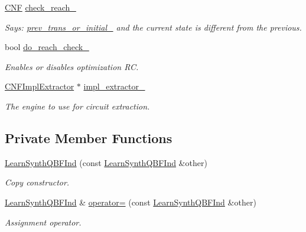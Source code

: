 \begin{DoxyCompactItemize}
\hyperlink{classCNF}{C\-N\-F} \hyperlink{classLearnSynthQBFInd_a6854254065f912e3d5fe07a1b895f1c6}{check\-\_\-reach\-\_\-}
\begin{DoxyCompactList}\small\item\em Says\-: \hyperlink{classLearnSynthQBFInd_ad99eafb7ee9134115f9fbe986e5eb0c5}{prev\-\_\-trans\-\_\-or\-\_\-initial\-\_\-} and the current state is different from the previous. \end{DoxyCompactList}\item 
bool \hyperlink{classLearnSynthQBFInd_af87e4a2c1d17c4c5bc398082d6d3e365}{do\-\_\-reach\-\_\-check\-\_\-}
\begin{DoxyCompactList}\small\item\em Enables or disables optimization R\-C. \end{DoxyCompactList}\item 
\hyperlink{classCNFImplExtractor}{C\-N\-F\-Impl\-Extractor} $\ast$ \hyperlink{classLearnSynthQBFInd_a8c285416b6f27e86bdda92fd578327b8}{impl\-\_\-extractor\-\_\-}
\begin{DoxyCompactList}\small\item\em The engine to use for circuit extraction. \end{DoxyCompactList}\end{DoxyCompactItemize}
\subsection*{Private Member Functions}
\begin{DoxyCompactItemize}
\item 
\hyperlink{classLearnSynthQBFInd_a55edd29ba2b93167b7d7b2bf6b835673}{Learn\-Synth\-Q\-B\-F\-Ind} (const \hyperlink{classLearnSynthQBFInd}{Learn\-Synth\-Q\-B\-F\-Ind} \&other)
\begin{DoxyCompactList}\small\item\em Copy constructor. \end{DoxyCompactList}\item 
\hyperlink{classLearnSynthQBFInd}{Learn\-Synth\-Q\-B\-F\-Ind} \& \hyperlink{classLearnSynthQBFInd_a411e8fa65ea22877c0fa9180f31120f9}{operator=} (const \hyperlink{classLearnSynthQBFInd}{Learn\-Synth\-Q\-B\-F\-Ind} \&other)
\begin{DoxyCompactList}\small\item\em Assignment operator. \end{DoxyCompactList}\end{DoxyCompactItemize}


